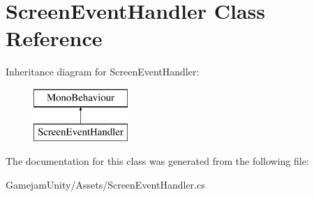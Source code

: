 \hypertarget{class_screen_event_handler}{}\section{Screen\+Event\+Handler Class Reference}
\label{class_screen_event_handler}
Inheritance diagram for Screen\+Event\+Handler\+:\begin{figure}[H]
\begin{center}
\leavevmode
\includegraphics[height=2.000000cm]{class_screen_event_handler}
\end{center}
\end{figure}


The documentation for this class was generated from the following file\+:\begin{DoxyCompactItemize}
\item 
Gamejam\+Unity/\+Assets/Screen\+Event\+Handler.\+cs\end{DoxyCompactItemize}
